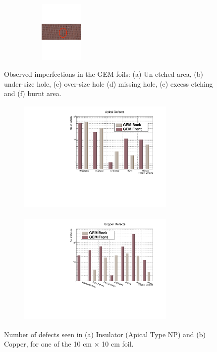 \begin{figure}[!htbp]
\begin{subfigure}[b]{0.29\textwidth}
        \caption{ }
        \label{fig:O_5b}
    \end{subfigure}
    \centering
    \begin{subfigure}[b]{0.29\textwidth}
        \includegraphics[width=4cm, height=3cm]{figures/GEM/figures/3f.pdf}
        \caption{ }
        \label{fig:O_5c}
    \end{subfigure}
   \caption{Observed imperfections in the GEM foils: (a) Un-etched area, (b) under-size hole, (c) over-size hole (d) missing hole, (e) excess etching and (f) burnt area.} \label{fig:Optical_01}
\end{figure}
\begin{figure}[!htbp]
    \centering
    \begin{subfigure}[b]{0.49\textwidth}
        \includegraphics[width=7.6cm, height=5.5cm]{figures/GEM/figures/Apical_Defects.pdf}\qquad
        \caption{ }
        \label{fig:O_9a}
    \end{subfigure}
    \begin{subfigure}[b]{0.49\textwidth}
        \includegraphics[width=7.6cm, height=5.5cm]{figures/GEM/figures/CopperDefects.pdf}
        \caption{ }
        \label{fig:O_9b}
    \end{subfigure}
   \caption{Number of defects seen in (a) Insulator (Apical Type NP) and (b) Copper, for one of the 10 cm $\times$ 10 cm foil.} \label{fig:Optical_04}
\end{figure}

